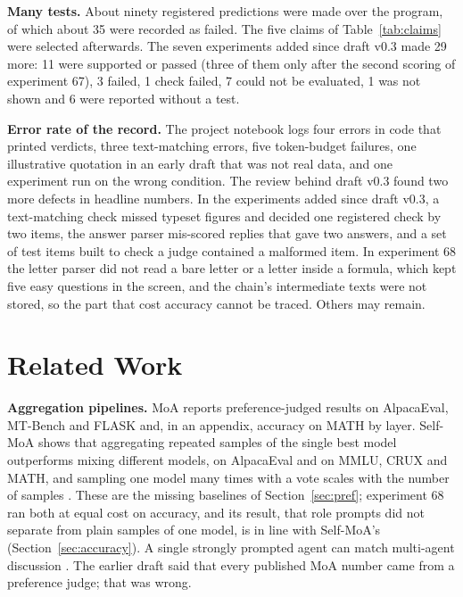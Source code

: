 \documentclass[10pt,twocolumn]{article}
\begin{document}
\textbf{Many tests.} About ninety registered predictions were made over
the program, of which about 35 were recorded as failed. The five
claims of Table~\ref{tab:claims} were selected afterwards. The seven
experiments added since draft v0.3 made 29 more: 11 were supported or
passed (three of them only after the second scoring of experiment 67),
3 failed, 1 check failed, 7 could not be evaluated, 1 was not shown and
6 were reported without a test.

\textbf{Error rate of the record.} The project notebook logs four
errors in code that printed verdicts, three text-matching errors, five
token-budget failures, one illustrative quotation in an early draft
that was not real data, and one experiment run on the wrong condition.
The review behind draft v0.3 found two more defects in headline
numbers. In the experiments added since draft v0.3, a text-matching check
missed typeset figures and decided one registered check by two items,
the answer parser mis-scored replies that gave two answers, and a set
of test items built to check a judge contained a malformed item. In
experiment 68 the letter parser did not read a bare letter or a letter
inside a formula, which kept five easy questions in the screen, and
the chain's intermediate texts were not stored, so the part that cost
accuracy cannot be traced. Others may remain.

\section{Related Work}
\label{sec:related}

\textbf{Aggregation pipelines.} MoA \cite{wang2024moa} reports
preference-judged results on AlpacaEval, MT-Bench and FLASK and, in an
appendix, accuracy on MATH by layer. Self-MoA \cite{li2025selfmoa}
shows that aggregating repeated samples of the single best model
outperforms mixing different models, on AlpacaEval and on MMLU, CRUX
and MATH, and sampling one model many times with a vote scales with the
number of samples \cite{li2024moreagents,wang2023selfconsistency}.
These are the missing baselines of Section~\ref{sec:pref}; experiment
68 ran both at equal cost on accuracy, and its result, that role
prompts did not separate from plain samples of one model, is in line
with Self-MoA's (Section~\ref{sec:accuracy}). A single
strongly prompted agent can match multi-agent discussion
\cite{wang2024rebuttal}. The earlier draft said that every published
MoA number came from a preference judge; that was wrong.
\end{document}
